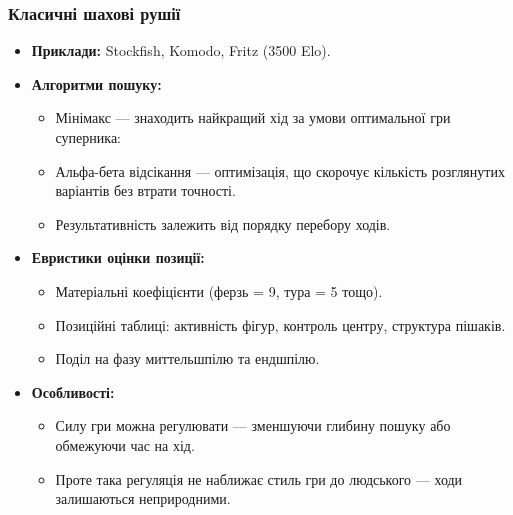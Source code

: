 \documentclass[
    10pt,
]{beamer}
\begin{document}
\begin{frame}[t]
    \frametitle{Класичні шахові рушії}

    \begin{itemize}
        \item \textbf{Приклади:} Stockfish, Komodo, Fritz (3500 Elo).
        
        \item \textbf{Алгоритми пошуку:}
        \begin{itemize}
            \item Мінімакс — знаходить найкращий хід за умови оптимальної гри суперника:
            \item Альфа-бета відсікання — оптимізація, що скорочує кількість розглянутих варіантів без втрати точності.
            \item Результативність залежить від порядку перебору ходів.
        \end{itemize}

        \item \textbf{Евристики оцінки позиції:}
        \begin{itemize}
            \item Матеріальні коефіцієнти (ферзь = 9, тура = 5 тощо).
            \item Позиційні таблиці: активність фігур, контроль центру, структура пішаків.
            \item Поділ на фазу миттельшпілю та ендшпілю.
        \end{itemize}

        \item \textbf{Особливості:}
        \begin{itemize}
            \item Силу гри можна регулювати — зменшуючи глибину пошуку або обмежуючи час на хід.
            \item Проте така регуляція не наближає стиль гри до людського — ходи залишаються неприродними.
        \end{itemize}
    \end{itemize}
\end{frame}
\end{document}
